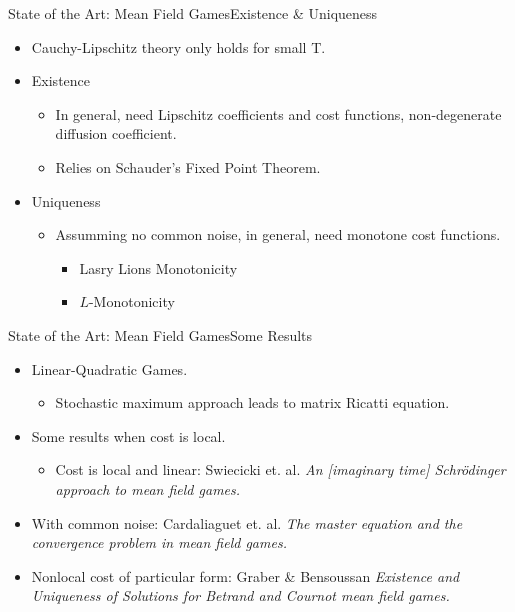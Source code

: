 \documentclass{beamer}
\begin{document}
\begin{frame}{State of the Art: Mean Field Games}{Existence \& Uniqueness}
	\begin{itemize}
		\item {
			Cauchy-Lipschitz theory only holds for small T.
		}
		\item {
			Existence
			\begin{itemize}
				\item In general, need Lipschitz coefficients and cost functions, non-degenerate diffusion coefficient.
				\item Relies on Schauder's Fixed Point Theorem.
			\end{itemize}
		}
		\item {
			Uniqueness
			\begin{itemize}
				\item Assumming no common noise, in general, need monotone cost functions.
				\begin{itemize}
				\item Lasry Lions Monotonicity
				\item $L$-Monotonicity
				\end{itemize}
			\end{itemize}
		}
	\end{itemize}
\end{frame}

\begin{frame}{State of the Art: Mean Field Games}{Some Results}
	\begin{itemize}
		\item {
			Linear-Quadratic Games.
		}
		\begin{itemize}
			\item Stochastic maximum approach leads to matrix Ricatti equation.
		\end{itemize}
		\item Some results when cost is local.
		\begin{itemize}
			\item Cost is local and linear: Swiecicki et. al. \textit{An [imaginary time] Schr{\"o}dinger approach to mean field games.}
		\end{itemize}
		\item With common noise: Cardaliaguet et. al. \textit{The master equation and the convergence problem in mean field games.}
		\item Nonlocal cost of particular form: Graber \& Bensoussan \textit{Existence and Uniqueness of Solutions for Betrand and Cournot mean field games.}
	\end{itemize}
\end{frame}
\end{document}
